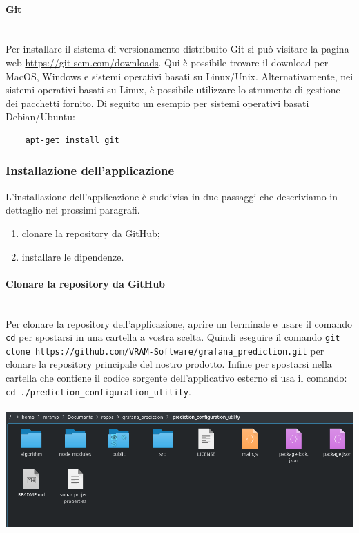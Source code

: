 \paragraph{Git}\mbox{}\\ [1mm]
Per installare il sistema di versionamento distribuito Git si può visitare la pagina web \url{https://git-scm.com/downloads}. Qui è possibile trovare il download per MacOS, Windows e sistemi operativi basati su Linux/Unix. Alternativamente, nei sistemi operativi basati su Linux, è possibile utilizzare lo strumento di gestione dei pacchetti fornito. Di seguito un esempio per sistemi operativi basati Debian/Ubuntu: \\
\begin{verbatim}
    apt-get install git
\end{verbatim}

\subsubsection{Installazione dell'applicazione}
L'installazione dell'applicazione è suddivisa in due passaggi che descriviamo in dettaglio nei prossimi paragrafi.
\begin{enumerate}
    \item clonare la repository da GitHub;
    \item installare le dipendenze.
\end{enumerate}

\paragraph{Clonare la repository da GitHub}\mbox{}\\ [1mm]
Per clonare la repository dell'applicazione, aprire un terminale e usare il comando \texttt{cd} per spostarsi in una cartella a vostra scelta. Quindi eseguire il comando \verb|git clone https://github.com/VRAM-Software/grafana_prediction.git| per clonare la repository principale del nostro prodotto.
Infine per spostarsi nella cartella che contiene il codice sorgente dell'applicativo esterno si usa il comando: \verb|cd ./prediction_configuration_utility|.
\\
\\
\includegraphics[width=\textwidth,height=\textheight,keepaspectratio]{img/directoryProject.png}


